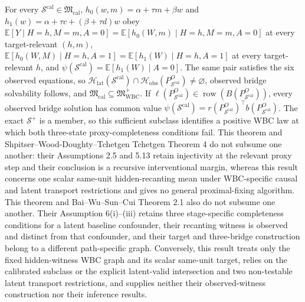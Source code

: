 For every \(\mathcal S^{\mathrm{cal}}\in\mathfrak M_{\mathrm{cal}}\), \(h_0(w,m)=\alpha+\tau m+\beta w\) and \(h_1(w)=\alpha+\tau c+(\beta+\tau d)w\) obey \(\mathbb E[Y\mid H=h,M=m,A=0]=\mathbb E[h_0(W,m)\mid H=h,M=m,A=0]\) at every target-relevant \((h,m)\), \(\mathbb E[h_0(W,M)\mid H=h,A=1]=\mathbb E[h_1(W)\mid H=h,A=1]\) at every target-relevant \(h\), and \(\psi(\mathcal S^{\mathrm{cal}})=\mathbb E[h_1(W)\mid A=0]\). The same pair satisfies the six observed equations, so \(\mathcal H_{\mathrm{lat}}(\mathcal S^{\mathrm{cal}})\cap\mathcal H_{\mathrm{obs}}(P_{\mathcal S^{\mathrm{cal}}}^O)\neq\varnothing\), observed bridge solvability follows, and \(\mathfrak M_{\mathrm{cal}}\subseteq\mathfrak M_{\mathrm{WBC}}^{+}\). If \(\ell(P_{\mathcal S^{\mathrm{cal}}}^O)\in\operatorname{row}(B(P_{\mathcal S^{\mathrm{cal}}}^O))\), every observed bridge solution has common value \(\psi(\mathcal S^{\mathrm{cal}})=r(P_{\mathcal S^{\mathrm{cal}}}^O)^{\top}b(P_{\mathcal S^{\mathrm{cal}}}^O)\). The exact \(\mathcal S^+\) is a member, so this sufficient subclass identifies a positive WBC law at which both three-state proxy-completeness conditions fail. This theorem and Shpitser--Wood-Doughty--Tchetgen Tchetgen Theorem 4 do not subsume one another: their Assumptions 2.5 and 5.13 retain injectivity at the relevant proxy step and their conclusion is a recursive interventional margin, whereas this result concerns one scalar same-unit hidden-recanting mean under WBC-specific causal and latent transport restrictions and gives no general proximal-fixing algorithm. This theorem and Bai--Wu--Sun--Cui Theorem 2.1 also do not subsume one another. Their Assumption 6(i)--(iii) retains three stage-specific completeness conditions for a latent baseline confounder, their recanting witness is observed and distinct from that confounder, and their target and three-bridge construction belong to a different path-specific graph. Conversely, this result treats only the fixed hidden-witness WBC graph and its scalar same-unit target, relies on the calibrated subclass or the explicit latent-valid intersection and two non-testable latent transport restrictions, and supplies neither their observed-witness construction nor their inference results.